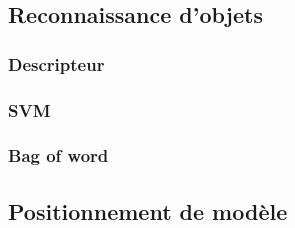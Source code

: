\subsection{Reconnaissance d'objets}
\subsubsection{Descripteur}
\subsubsection{SVM} %
\subsubsection{Bag of word}

\subsection{Positionnement de modèle}
